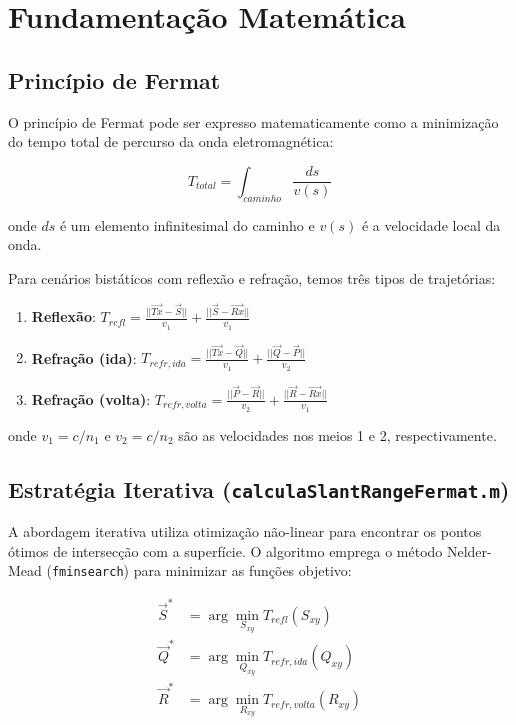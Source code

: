 \documentclass[11pt,a4paper]{article}
\begin{document}
\section{Fundamentação Matemática}

\subsection{Princípio de Fermat}

O princípio de Fermat pode ser expresso matematicamente como a minimização do tempo total de percurso da onda eletromagnética:

\begin{equation}
T_{total} = \int_{caminho} \frac{ds}{v(s)}
\end{equation}

onde $ds$ é um elemento infinitesimal do caminho e $v(s)$ é a velocidade local da onda.

Para cenários bistáticos com reflexão e refração, temos três tipos de trajetórias:

\begin{enumerate}
\item \textbf{Reflexão}: $T_{refl} = \frac{||\vec{Tx} - \vec{S}||}{v_1} + \frac{||\vec{S} - \vec{Rx}||}{v_1}$
\item \textbf{Refração (ida)}: $T_{refr,ida} = \frac{||\vec{Tx} - \vec{Q}||}{v_1} + \frac{||\vec{Q} - \vec{P}||}{v_2}$
\item \textbf{Refração (volta)}: $T_{refr,volta} = \frac{||\vec{P} - \vec{R}||}{v_2} + \frac{||\vec{R} - \vec{Rx}||}{v_1}$
\end{enumerate}

onde $v_1 = c/n_1$ e $v_2 = c/n_2$ são as velocidades nos meios 1 e 2, respectivamente.

\subsection{Estratégia Iterativa (\texttt{calculaSlantRangeFermat.m})}

A abordagem iterativa utiliza otimização não-linear para encontrar os pontos ótimos de intersecção com a superfície. O algoritmo emprega o método Nelder-Mead (\texttt{fminsearch}) para minimizar as funções objetivo:

\begin{align}
\vec{S}^* &= \arg\min_{S_{xy}} T_{refl}(S_{xy}) \\
\vec{Q}^* &= \arg\min_{Q_{xy}} T_{refr,ida}(Q_{xy}) \\
\vec{R}^* &= \arg\min_{R_{xy}} T_{refr,volta}(R_{xy})
\end{align}
\end{document}
